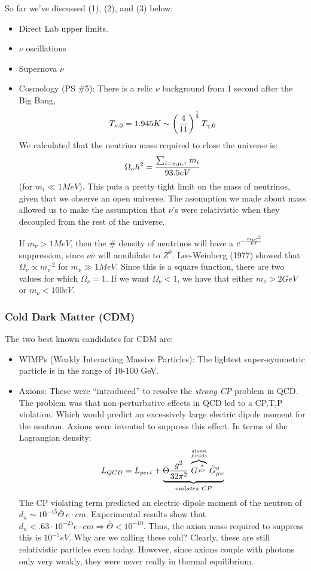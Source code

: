 \documentclass{article}
\def\imply{\Rightarrow}
\def\imply{\Rightarrow}
\begin{document}
So far we've discussed (1), (2), and (3) below:
\begin{itemize}
\item Direct Lab upper limits.
\item $\nu$ oscillations
\item Supernova $\nu$
\item Cosmology (PS \#5): 
There is a relic $\nu$ background from 1 second after
the Big Bang, 
$$T_{\nu,0}=1.945K\sim\left({4\over11}\right)^{1\over3}
T_{\gamma,0}$$
We calculated that the neutrino mass required to close the universe is:
$$\Omega_\nu h^2={\sum_{i=e,\mu,\tau}{m_i}\over93.5eV}$$
(for $m_i\ll1MeV$). This puts a pretty tight limit on the mass of neutrinos, 
given that we observe an open universe.  The assumption we made about mass
allowed us to make the assumption that $\nu$'s were relativistic when
they decoupled from the rest of the universe.  \par
If $m_\nu>1MeV$, then
the \# density of neutrinos will have a $e^{-{m_\nu c^2\over kT}}$ suppression, 
since $\nu\bar \nu$ will annihilate to $Z^0$. Lee-Weinberg (1977) showed that
$\Omega_\nu\propto m_\nu^{-2}$ for $m_\nu\gg1MeV$.  Since this is a square
function, there are two values for which $\Omega_\nu=1$.  If we want
$\Omega_\nu<1$, we have that either $m_\nu>2GeV$ or $m_\nu<100eV$.
\end{itemize}

\subsubsection*{ Cold Dark Matter (CDM)}

The two best known candidates for CDM are:
\begin{itemize}
\item WIMPs (Weakly Interacting Massive Particles): The lightest
super-symmetric particle is in the range of 10-100 GeV.
\item Axions: These were ``introduced'' to resolve the {\it strong CP}
problem in QCD.  The problem was that non-perturbative effects in QCD led
to a CP,T,P violation.  Which would predict an excessively large electric
dipole moment for the neutron.  Axions were invented to suppress this effect.
In terms of the Lagrangian density:
$$L_{QCD}=L_{pert}+\underbrace{\bar \Theta{g^2\over32\pi^2}
\overbrace{G^{a\atop\mu\nu}}^{gluon
\atop fields}\tilde G_{\mu\nu}^a}_{violates\ CP}$$
The CP violating term predicted an electric dipole moment of the neutron of
$d_n\sim10^{-15}\bar \Theta\ e\cdot cm$.  Experimental results show that
$d_n<.63\cdot10^{-25} e\cdot cm\imply\bar \Theta<10^{-10}$.  Thus, the axion mass
required to suppress this is $10^{-5}eV$.  Why are we calling these cold? 
Clearly, these are still relativistic particles even today.  However, since
axions couple with photons only very weakly, they were never really in
thermal equilibrium.
\end{itemize}
\end{document}
